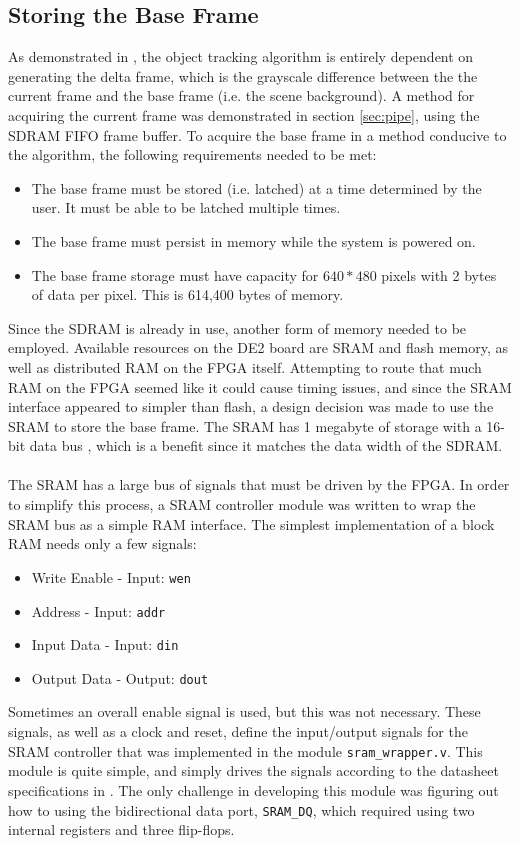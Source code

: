 \documentclass[11pt]{article} %
\begin{document}
\subsection{Storing the Base Frame}
As demonstrated in \cite{phase1}, the object tracking algorithm is entirely dependent on generating the delta frame, which is the grayscale difference between the the current frame and the base frame (i.e. the scene background). A method for acquiring the current frame was demonstrated in section \ref{sec:pipe}, using the SDRAM FIFO frame buffer. To acquire the base frame in a method conducive to the algorithm, the following requirements needed to be met:
\begin{itemize}
\item The base frame must be stored (i.e. latched) at a time determined by the user. It must be able to be latched multiple times.
\item The base frame must persist in memory while the system is powered on.
\item The base frame storage must have capacity for $640*480$ pixels with 2 bytes of data per pixel. This is 614,400 bytes of memory.
\end{itemize}
Since the SDRAM is already in use, another form of memory needed to be employed. Available resources on the DE2 board are SRAM and flash memory, as well as distributed RAM on the FPGA itself. Attempting to route that much RAM on the FPGA seemed like it could cause timing issues, and since the SRAM interface appeared to simpler than flash, a design decision was made to use the SRAM to store the base frame. The SRAM has 1 megabyte of storage with a 16-bit data bus \cite{sram}, which is a benefit since it matches the data width of the SDRAM. \\\\
The SRAM has a large bus of signals that must be driven by the FPGA. In order to simplify this process, a SRAM controller module was written to wrap the SRAM bus as a simple RAM interface. The simplest implementation of a block RAM needs only a few signals:
\begin{itemize}
\item Write Enable - Input: \texttt{wen}
\item Address - Input: \texttt{addr}
\item Input Data - Input: \texttt{din}
\item Output Data - Output: \texttt{dout}
\end{itemize}
Sometimes an overall enable signal is used, but this was not necessary. These signals, as well as a clock and reset, define the input/output signals for the SRAM controller that was implemented in the module \texttt{sram\_wrapper.v}. This module is quite simple, and simply drives the signals according to the datasheet specifications in \cite{sram}. The only challenge in developing this module was figuring out how to using the bidirectional data port, \texttt{SRAM\_DQ}, which required using two internal registers and three flip-flops. \\\\
\end{document}

